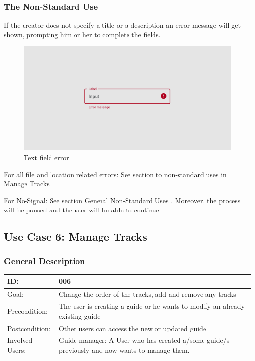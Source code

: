 \documentclass[12pt]{article}
\theoremstyle{definition}
\newenvironment{text}{
   \setlength{\parindent}{0pt}
   \color{black}
}{}
\begin{document}
    \subsubsection{The Non-Standard Use}
    \begin{text}
    If the creator does not specify a title or a description an error message will get shown, prompting him or her to complete the fields.
    \begin{figure}[hbt!]
        \centering
        \includegraphics[width=1\linewidth]{UIs/text-field-error.png}
        \caption{Text field error}
        \label{fig:text-field-error}
    \end{figure}
    
    For all file and location related errors: \hyperref[sec:managetracks_nsu]{See section to non-standard uses in Manage Tracks }
    
    For No-Signal: \hyperref[sec:gnsu]{See section General Non-Standard Uses }.
    Moreover, the process will be paused and the user will be able to continue 
    \end{text}

\subsection{Use Case 6: Manage Tracks}
    \subsubsection{General Description}
    \begin{tabular}{|p{.2\linewidth}|p{.65\linewidth}|}
    \hline 
    ID: & 006 \\ \hline
    Goal: & Change the order of the tracks, add and remove any tracks \\ \hline
    Precondition: & The user is creating a guide or he wants to modify an already existing guide \\ \hline
    Postcondition: & Other users can access the new or updated guide  \\ \hline
    Involved Users: & Guide manager: A User who has created a/some guide/s previously and now wants to manage them.\\ \hline
    \end{tabular}
    
\end{document}
